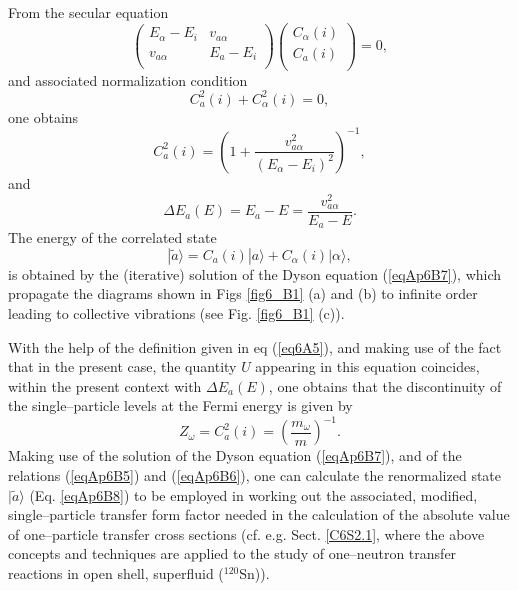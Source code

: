   From the secular equation
\begin{equation}
\left(
\begin{matrix}
E_\alpha-E_i & v_{a\alpha}\\  
v_{a \alpha} & E_a-E_i \\ 
\end{matrix}
\right)
\left(
\begin{matrix}
C_\alpha(i)\\  
C_a(i)\\ 
\end{matrix}
\right)=0,
\end{equation}
and associated normalization condition
\begin{equation}\label{eqAp6B5}
C_a^2(i)+C_\alpha^2(i)=0,
 \end{equation}
one obtains
\begin{equation}\label{eqAp6B6}
C_a^2(i)=\left(1+\frac{v_{a\alpha}^2}{(E_\alpha-E_i)^2}\right)^{-1},
 \end{equation}
and 
\begin{equation}\label{eqAp6B7}
\Delta E_a(E)=E_a-E=\frac{v_{a\alpha}^2}{E_a-E}.
 \end{equation}
The energy of the correlated state
\begin{equation}\label{eqAp6B8}
|\tilde a\rangle=C_a(i)| a\rangle+C_\alpha (i)| \alpha\rangle,
 \end{equation}
is obtained by the (iterative) solution of the Dyson equation (\ref{eqAp6B7}), which propagate the diagrams shown in Figs \ref{fig6_B1} (a) and (b) to infinite order leading to collective vibrations (see Fig. \ref{fig6_B1} (c)).

With the help of the definition given in eq (\ref{eq6A5}), and making use of the fact that in the present case, the quantity $U$ appearing in this equation coincides, within the present context with $\Delta E_a(E)$, one obtains that the discontinuity of the single--particle levels at the Fermi energy is given by
\begin{equation}\label{eqAp6B4}
Z_\omega=C_a^2(i)=\left(\frac{m_\omega}{m}\right)^{-1}.
 \end{equation}
 Making use of the solution of  the Dyson equation (\ref{eqAp6B7}), and of the relations (\ref{eqAp6B5}) and (\ref{eqAp6B6}), one can calculate the renormalized state $|\tilde a\rangle$ (Eq. \ref{eqAp6B8}) to be employed in working out the associated, modified, single--particle transfer form factor needed in the calculation of the absolute value of one--particle transfer cross sections (cf. e.g. Sect. \ref{C6S2.1}, where the  above concepts and techniques are applied to the study of one--neutron transfer reactions in open shell, superfluid ($^{120}$Sn)).	 
 
